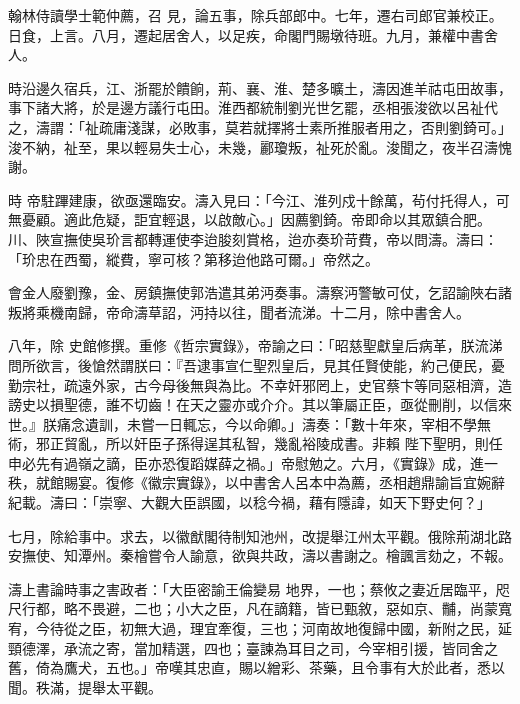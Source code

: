 \begin{pinyinscope}
 翰林侍讀學士範仲薦，召
 見，論五事，除兵部郎中。七年，遷右司郎官兼校正。日食，上言。八月，遷起居舍人，以足疾，命閣門賜墩待班。九月，兼權中書舍人。



 時沿邊久宿兵，江、浙罷於饋餉，荊、襄、淮、楚多曠土，濤因進羊祜屯田故事，事下諸大將，於是邊方議行屯田。淮西都統制劉光世乞罷，丞相張浚欲以呂祉代之，濤謂：「祉疏庸淺謀，必敗事，莫若就擇將士素所推服者用之，否則劉錡可。」浚不納，祉至，果以輕易失士心，未幾，酈瓊叛，祉死於亂。浚聞之，夜半召濤愧謝。



 時
 帝駐蹕建康，欲亟還臨安。濤入見曰：「今江、淮列戍十餘萬，茍付托得人，可無憂顧。適此危疑，詎宜輕退，以啟敵心。」因薦劉錡。帝即命以其眾鎮合肥。川、陜宣撫使吳玠言都轉運使李迨朘刻賞格，迨亦奏玠苛費，帝以問濤。濤曰：「玠忠在西蜀，縱費，寧可核？第移迨他路可爾。」帝然之。



 會金人廢劉豫，金、房鎮撫使郭浩遣其弟沔奏事。濤察沔警敏可仗，乞詔諭陜右諸叛將乘機南歸，帝命濤草詔，沔持以往，聞者流涕。十二月，除中書舍人。



 八年，除
 史館修撰。重修《哲宗實錄》，帝諭之曰：「昭慈聖獻皇后病革，朕流涕問所欲言，後愴然謂朕曰：『吾逮事宣仁聖烈皇后，見其任賢使能，約己便民，憂勤宗社，疏遠外家，古今母後無與為比。不幸奸邪罔上，史官蔡卞等同惡相濟，造謗史以損聖德，誰不切齒！在天之靈亦或介介。其以筆屬正臣，亟從刪削，以信來世。』朕痛念遺訓，未嘗一日輒忘，今以命卿。」濤奏：「數十年來，宰相不學無術，邪正貿亂，所以奸臣子孫得逞其私智，幾亂裕陵成書。非賴
 陛下聖明，則任申必先有過嶺之謫，臣亦恐復蹈媒薛之禍。」帝慰勉之。六月，《實錄》成，進一秩，就館賜宴。復修《徽宗實錄》，以中書舍人呂本中為薦，丞相趙鼎諭旨宜婉辭紀載。濤曰：「崇寧、大觀大臣誤國，以稔今禍，藉有隱諱，如天下野史何？」



 七月，除給事中。求去，以徽猷閣待制知池州，改提舉江州太平觀。俄除荊湖北路安撫使、知潭州。秦檜嘗令人諭意，欲與共政，濤以書謝之。檜諷言劾之，不報。



 濤上書論時事之害政者：「大臣密諭王倫變易
 地界，一也；蔡攸之妻近居臨平，咫尺行都，略不畏避，二也；小大之臣，凡在謫籍，皆已甄敘，惡如京、黼，尚蒙寬宥，今待從之臣，初無大過，理宜牽復，三也；河南故地復歸中國，新附之民，延頸德澤，承流之寄，當加精選，四也；臺諫為耳目之司，今宰相引援，皆同舍之舊，倚為鷹犬，五也。」帝嘆其忠直，賜以繒彩、茶藥，且令事有大於此者，悉以聞。秩滿，提舉太平觀。




\end{pinyinscope}
